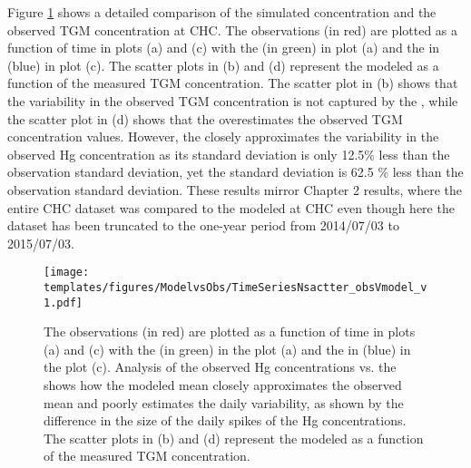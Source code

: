 \FloatBarrier
\begin{flushleft}
   Figure \ref{fig:ModelvsObsNstats} shows a detailed comparison of the simulated \hg concentration and the observed TGM concentration at CHC. The observations (in red) are plotted as a function of time in plots (a) and (c) with the \off (in green) in plot (a)  and the \on in (blue) in plot (c). The scatter plots in (b) and (d) represent the modeled \hg  as a function of the measured TGM concentration. The scatter plot in (b) shows that the variability in the observed TGM concentration is not captured by the \off, while the scatter plot in (d) shows that the \on overestimates the observed TGM concentration values. However, the \on closely approximates the variability in the observed Hg concentration as its standard deviation is only 12.5\% less than the observation standard deviation, yet the \off standard deviation is 62.5 \% less than the observation standard deviation. These results mirror Chapter 2 results, where the entire CHC dataset was compared to the modeled \hgc at CHC even though here the dataset has been truncated to the one-year period from 2014/07/03 to 2015/07/03. 
\end{flushleft}
\begin{figure}[H]
  \texttt{[image: templates/figures/ModelvsObs/TimeSeriesNsactter\_obsVmodel\_v1.pdf]}
  \centering
  \caption[Hg concentration in the atmosphere as a function of time and scatter plots of modeled concentration as a function of the observations]{The observations (in red) are plotted as a function of time in plots (a) and (c) with the \off (in green) in the plot (a) and the \on in (blue) in the plot (c). Analysis of the observed Hg concentrations vs. the \off  shows how the modeled mean closely approximates the observed mean and poorly estimates the daily variability, as shown by the difference in the size of the daily spikes of the Hg concentrations. The scatter plots in (b) and (d) represent the modeled \hg  as a function of the measured TGM concentration.}
  \label{fig:ModelvsObsNstats}
\end{figure}
\FloatBarrier

